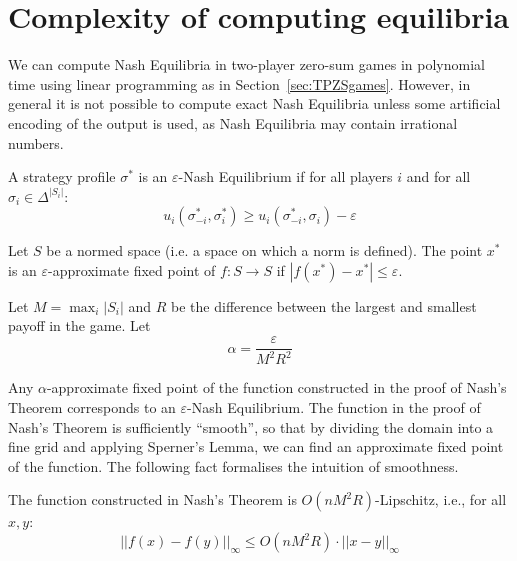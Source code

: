 \section{Complexity of computing equilibria}

We can compute Nash Equilibria in two-player zero-sum games in polynomial time
using linear programming as in Section~\ref{sec:TPZSgames}. However, in general
it is not possible to compute exact Nash Equilibria unless some artificial
encoding of the output is used, as Nash Equilibria may contain irrational
numbers.

\begin{definition}
	A strategy profile $\sigma^*$ is an $\varepsilon$-Nash Equilibrium if for
	all players $i$ and for all $\sigma_i \in \Delta^{|S_i|}$:
	\begin{equation}
		u_i(\sigma^*_{-i}, \sigma^*_i) \ge u_i(\sigma^*_{-i}, \sigma_i) - \varepsilon
	\end{equation}
\end{definition}

\begin{definition}
	Let $S$ be a normed space (i.e. a space on which a norm is defined). The
	point $x^*$ is an $\varepsilon$-approximate fixed point of $f:S \rightarrow
	S$ if $|f(x^*) - x^*| \le \varepsilon$.
\end{definition}

Let $M = \max_i |S_i|$ and $R$ be the difference between the largest and
smallest payoff in the game. Let
\begin{equation}
	\alpha = \frac{\varepsilon}{M^2 R^2}
\end{equation}

Any $\alpha$-approximate fixed point of the function constructed in the proof
of Nash's Theorem corresponds to an $\varepsilon$-Nash Equilibrium. The
function in the proof of Nash's Theorem is sufficiently ``smooth'', so that by
dividing the domain into a fine grid and applying Sperner's Lemma, we can find
an approximate fixed point of the function. The following fact formalises the
intuition of smoothness.

\begin{fact}
	\label{fact:Lipschitz}
	The function constructed in Nash's Theorem is $O(nM^2R)$-Lipschitz, i.e.,
	for all $x, y$:
	\begin{equation}
		||f(x) - f(y)||_\infty \le O(nM^2R) \cdot ||x - y||_\infty
	\end{equation}
\end{fact}

